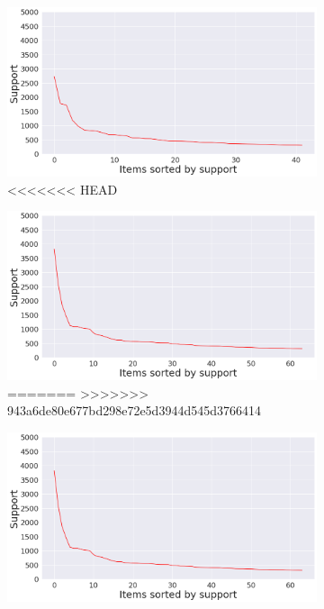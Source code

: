 \documentclass[12pt,%
               a4paper,%
               oneside,openany,%
               titlepage,%
               headinclude,footinclude,%
               BCOR5mm,%
               cleardoublepage=empty,%
               tablecaptionabove,%
               floatperchapter,
               ]{scrreprt}                 %
\begin{document}
\begin{figure}[ht]
\begin{minipage}[b]{0.5\linewidth}
\begin{figure}[ht]
\begin{minipage}[b]{0.5\linewidth}
    \vspace{4ex}
  \end{minipage}
  \begin{minipage}[b]{0.5\linewidth}
    \centering
    \includegraphics[width=.9\linewidth]{Figures/Support_distrubution_delta.png}
    \vspace{4ex}
<<<<<<< HEAD
  \end{minipage}
    \begin{minipage}[b]{0.5\linewidth}
    \centering
    \includegraphics[width=.9\linewidth]{Figures/Support_distrubution_pfizer.png}
    \vspace{4ex}
=======
>>>>>>> 943a6de80e677bd298e72e5d3944d545d3766414
  \end{minipage}
  \begin{minipage}[b]{0.5\linewidth}
    \centering
    \includegraphics[width=.9\linewidth]{Figures/Support_distrubution_pfizer.png}

\end{minipage}
\end{figure}
\end{minipage}
\end{figure}
\end{document}
